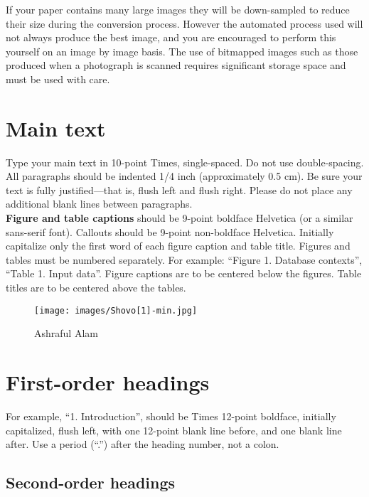 \documentclass[10pt]{article}
\begin{document}
If your paper contains many large images they will be down-sampled to reduce their size during the conversion process.  However the automated process used will not always produce the best image, and you are encouraged to perform this yourself on an image by image basis. The use of bitmapped images such as those produced when a photograph is scanned requires significant storage space and must be used with care.

\section{Main text}

Type your main text in 10-point Times, single-spaced. Do not use double-spacing. All paragraphs should be indented 1/4 inch (approximately 0.5 cm).  Be sure your text is fully justified—that is, flush left and flush right. Please do not place any additional blank lines between paragraphs. \\
\textbf{Figure and table captions} should be 9-point boldface Helvetica (or a similar sans-serif font).  Callouts should be 9-point non-boldface Helvetica. Initially capitalize only the first word of each figure caption and table title. Figures and tables must be numbered separately. For example: ``Figure 1. Database contexts'', ``Table 1. Input data''. Figure captions are to be centered below the figures. Table titles are to be centered above the tables.

\begin{figure}[thb]
    \centering
	\texttt{[image: images/Shovo[1]-min.jpg]}
	\caption{Ashraful Alam}
	\label{fig: sample-figure}       %
\end{figure}

\section{First-order headings}

For example, “1. Introduction”, should be Times 12-point boldface, initially capitalized, flush left, with one 12-point blank line before, and one blank line after. Use a period (“.”) after the heading number, not a colon. 

\subsection{Second-order headings}
 
\end{document}
